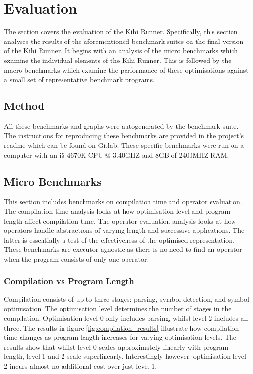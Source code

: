 \chapter{Evaluation} \label{C:evaluation}
The section covers the evaluation of the Kihi Runner. Specifically, this section analyses the results of the aforementioned benchmark suites on the final version of the Kihi Runner. It begins with an analysis of the micro benchmarks which examine the individual elements of the Kihi Runner. This is followed by the macro benchmarks which examine the performance of these optimisations against a small set of representative benchmark programs.

\section{Method}
All these benchmarks and graphs were autogenerated by the benchmark suite. The instructions for reproducing these benchmarks are provided in the project's readme which can be found on Gitlab. These specific benchmarks were run on a computer with an i5-4670K CPU @ 3.40GHZ and 8GB of 2400MHZ RAM.

\section{Micro Benchmarks}
This section includes benchmarks on compilation time and operator evaluation. The compilation time analysis looks at how optimisation level and program length affect compilation time. The operator evaluation analysis looks at how operators handle abstractions of varying length and successive applications. The latter is essentially a test of the effectiveness of the optimised representation. These benchmarks are executor agnostic as there is no need to find an operator when the program consists of only one operator.

\subsection{Compilation vs Program Length}

Compilation consists of up to three stages: parsing, symbol detection, and symbol optimisation. The optimisation level determines the number of stages in the compilation. Optimisation level 0 only includes parsing, whilst level 2 includes all three. The results in figure \ref{fig:compilation_results} illustrate how compilation time changes as program length increases for varying optimisation levels. The results show that whilst level 0 scales approximately linearly with program length, level 1 and 2 scale superlinearly. Interestingly however, optimisation level 2 incurs almost no additional cost over just level 1.

